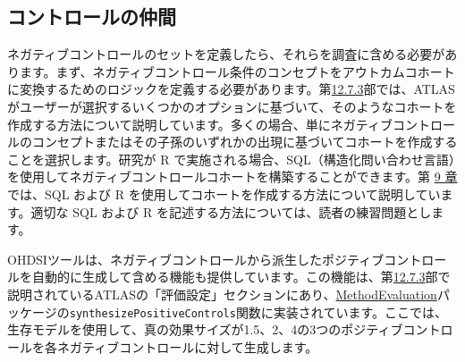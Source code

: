 \documentclass[
  11pt]{book}
\theoremstyle{definition}
\theoremstyle{definition}
\theoremstyle{definition}
\theoremstyle{definition}
\theoremstyle{remark}
\begin{document}
\subsection{コントロールの仲間}\label{ux30b3ux30f3ux30c8ux30edux30fcux30ebux306eux4ef2ux9593}

ネガティブコントロールのセットを定義したら、それらを調査に含める必要があります。まず、ネガティブコントロール条件のコンセプトをアウトカムコホートに変換するためのロジックを定義する必要があります。第\href{https://ohdsi.github.io/TheBookOfOhdsi/PopulationLevelEstimation.html\#evaluationSettings}{12.7.3}部では、ATLASがユーザーが選択するいくつかのオプションに基づいて、そのようなコホートを作成する方法について説明しています。多くの場合、単にネガティブコントロールのコンセプトまたはその子孫のいずれかの出現に基づいてコホートを作成することを選択します。研究が R で実施される場合、SQL（構造化問い合わせ言語）を使用してネガティブコントロールコホートを構築することができます。第 \href{https://ohdsi.github.io/TheBookOfOhdsi/SqlAndR.html\#SqlAndR}{9 章}では、SQL および R を使用してコホートを作成する方法について説明しています。適切な SQL および R を記述する方法については、読者の練習問題とします。

OHDSIツールは、ネガティブコントロールから派生したポジティブコントロールを自動的に生成して含める機能も提供しています。この機能は、第\href{https://ohdsi.github.io/TheBookOfOhdsi/PopulationLevelEstimation.html\#evaluationSettings}{12.7.3}部で説明されているATLASの「評価設定」セクションにあり、\href{https://ohdsi.github.io/MethodEvaluation/}{MethodEvaluation}パッケージの\texttt{synthesizePositiveControls}関数に実装されています。ここでは、生存モデルを使用して、真の効果サイズが1.5、2、4の3つのポジティブコントロールを各ネガティブコントロールに対して生成します。
\end{document}
